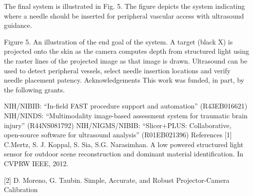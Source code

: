 \documentclass{llncs}
\begin{document}
The final system is illustrated in Fig. 5.  The figure depicts the system indicating where a needle should be inserted for peripheral vascular access with ultrasound guidance.


Figure 5. An illustration of the end goal of the system. A target (black X) is projected onto the skin as the camera computes depth from structured light using the raster lines of the projected image as that image is drawn. Ultrasound can be used to detect peripheral vessels, select needle insertion locations and verify needle placement patency.
Acknowledgements
This work was funded, in part, by the following grants.

NIH/NIBIB: “In-field FAST procedure support and automation” (R43EB016621)
NIH/NINDS: “Multimodality image-based assessment system for traumatic brain injury” (R44NS081792)
NIH/NIGMS/NIBIB: “Slicer+PLUS: Collaborative, open-source software for ultrasound analysis” (R01EB021396)
References
[1] C.Mertz, S. J. Koppal, S. Sia, S.G. Narasimhan. A low powered structured light sensor for outdoor scene reconstruction and dominant material identification. In CVPRW IEEE, 2012.

[2] D. Moreno, G. Taubin. Simple, Accurate, and Robust Projector-Camera Calibration
\end{document}
